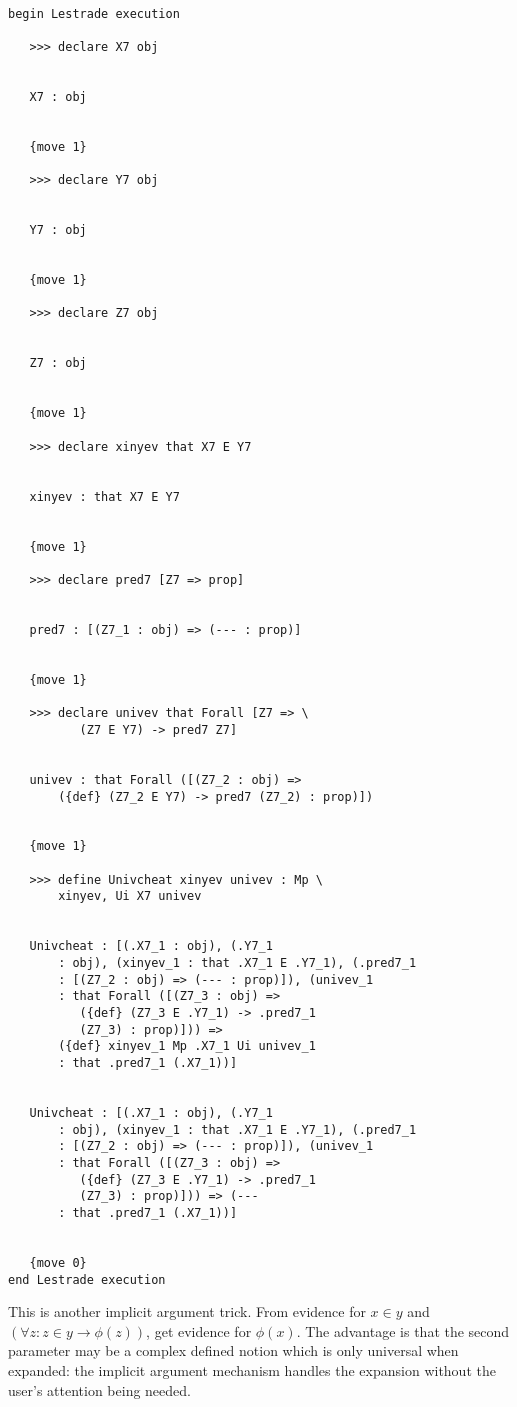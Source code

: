 \documentclass[12pt]{article}
\begin{document}
\begin{verbatim}

begin Lestrade execution

   >>> declare X7 obj


   X7 : obj


   {move 1}

   >>> declare Y7 obj


   Y7 : obj


   {move 1}

   >>> declare Z7 obj


   Z7 : obj


   {move 1}

   >>> declare xinyev that X7 E Y7


   xinyev : that X7 E Y7


   {move 1}

   >>> declare pred7 [Z7 => prop]


   pred7 : [(Z7_1 : obj) => (--- : prop)]


   {move 1}

   >>> declare univev that Forall [Z7 => \
          (Z7 E Y7) -> pred7 Z7]


   univev : that Forall ([(Z7_2 : obj) => 
       ({def} (Z7_2 E Y7) -> pred7 (Z7_2) : prop)])


   {move 1}

   >>> define Univcheat xinyev univev : Mp \
       xinyev, Ui X7 univev


   Univcheat : [(.X7_1 : obj), (.Y7_1 
       : obj), (xinyev_1 : that .X7_1 E .Y7_1), (.pred7_1 
       : [(Z7_2 : obj) => (--- : prop)]), (univev_1 
       : that Forall ([(Z7_3 : obj) => 
          ({def} (Z7_3 E .Y7_1) -> .pred7_1 
          (Z7_3) : prop)])) => 
       ({def} xinyev_1 Mp .X7_1 Ui univev_1 
       : that .pred7_1 (.X7_1))]


   Univcheat : [(.X7_1 : obj), (.Y7_1 
       : obj), (xinyev_1 : that .X7_1 E .Y7_1), (.pred7_1 
       : [(Z7_2 : obj) => (--- : prop)]), (univev_1 
       : that Forall ([(Z7_3 : obj) => 
          ({def} (Z7_3 E .Y7_1) -> .pred7_1 
          (Z7_3) : prop)])) => (--- 
       : that .pred7_1 (.X7_1))]


   {move 0}
end Lestrade execution
\end{verbatim}

This is another implicit argument trick.  From evidence for $x \in y$ and $(\forall z: z \in y \rightarrow \phi(z))$, get evidence for $\phi(x)$.  The advantage is
that the second parameter may be a complex defined notion which is only universal when expanded:  the implicit argument mechanism handles the expansion without the user's attention being needed.
\end{document}
